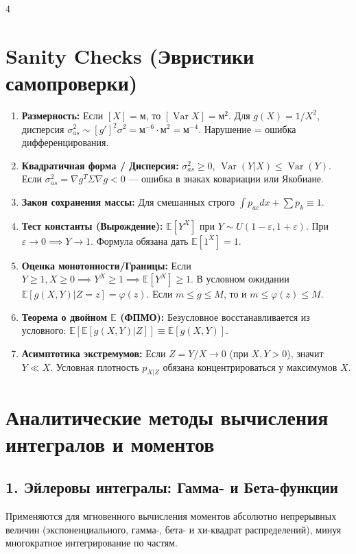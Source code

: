 \documentclass[a4paper, landscape]{article}
\newcommand{\E}{\mathbb{E}}
\DeclareMathOperator{\Var}{Var}
\begin{document}
\begin{multicols*}{4}
\section*{Sanity Checks (Эвристики самопроверки)}
\begin{enumerate}
    \item \textbf{Размерность:} Если $[X]\!=\!\text{м}$, то $[\Var X]\!=\!\text{м}^2$. Для $g(X)\!=\!1/X^2$, дисперсия $\sigma_{as}^2 \sim [g']^2 \sigma^2 \!=\! \text{м}^{-6} \cdot \text{м}^2 = \text{м}^{-4}$. Нарушение = ошибка дифференцирования.
    \item \textbf{Квадратичная форма / Дисперсия:} $\sigma_{as}^2 \ge 0$, $\Var(Y|X) \le \Var(Y)$. Если $\sigma_{as}^2 = \nabla g^T \Sigma \nabla g < 0$ --- ошибка в знаках ковариации или Якобиане.
    \item \textbf{Закон сохранения массы:} Для смешанных строго $\int p_{ac} dx + \sum p_k \equiv 1$.
    \item \textbf{Тест константы (Вырождение):} $\E[Y^X]$ при $Y \!\sim\! U(1\!-\!\varepsilon, 1\!+\!\varepsilon)$. При $\varepsilon \!\to\! 0 \implies Y \!\to\! 1$. Формула обязана дать $\E[1^X] \!=\! 1$.
    \item \textbf{Оценка монотонности/Границы:} Если $Y \!\ge\! 1, X \!\ge\! 0 \implies Y^X \!\ge\! 1 \implies \E[Y^X] \!\ge\! 1$. В условном ожидании $\E[g(X,Y)|Z=z] = \varphi(z)$. Если $m \!\le\! g \!\le\! M$, то и $m \!\le\! \varphi(z) \!\le\! M$.
    \item \textbf{Теорема о двойном $\E$ (ФПМО):} Безусловное восстанавливается из условного: $\E[\E[g(X,Y)|Z]] \equiv \E[g(X,Y)]$.
    \item \textbf{Асимптотика экстремумов:} Если $Z \!=\! Y/X \to 0$ (при $X,Y \!>\! 0$), значит $Y \!\ll\! X$. Условная плотность $p_{X|Z}$ обязана концентрироваться у максимумов $X$.
\end{enumerate}

\section*{Аналитические методы вычисления интегралов и моментов}

\subsection*{1. Эйлеровы интегралы: Гамма- и Бета-функции}
Применяются для мгновенного вычисления моментов абсолютно непрерывных величин (экспоненциального, гамма-, бета- и хи-квадрат распределений), минуя многократное интегрирование по частям.


\end{multicols*}
\end{document}
